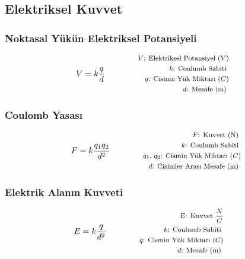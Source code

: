 \subsection{Elektriksel Kuvvet}

\subsubsection*{Noktasal Yükün Elektriksel Potansiyeli}
\begin{equation}
    V = k \frac{q}{d} \qquad \qquad \parbox{4cm}{\footnotesize$\begin{aligned}
        V\text{: Elektriksel Potansiyel } (V) \\
        k\text{: Coulumb Sabiti } \\
        q\text{: Cismin Yük Miktarı } (C) \\
        d\text{: Mesafe (m) }
\end{aligned}$}
\end{equation}

\subsubsection*{Coulomb Yasası}
\begin{equation}
    F = k\frac{q_1 q_2}{d^2} \qquad \qquad \parbox{4cm}{\footnotesize$\begin{aligned}
        F\text{: Kuvvet (N) } \\
        k\text{: Coulumb Sabiti } \\
        q_1\text{, }q_2\text{: Cismin Yük Miktarı } (C) \\
        d\text{: Cisimler Arası Mesafe (m) }
\end{aligned}$}
\end{equation}

\subsubsection*{Elektrik Alanın Kuvveti}
\begin{equation}
    E = k\frac{q}{d^2} \qquad \qquad \parbox{4cm}{\footnotesize$\begin{aligned}
        E\text{: Kuvvet } \frac{N}{C} \\
        k\text{: Coulumb Sabiti } \\
        q\text{: Cismin Yük Miktarı } (C) \\
        d\text{: Mesafe (m) }
\end{aligned}$}
\end{equation}

